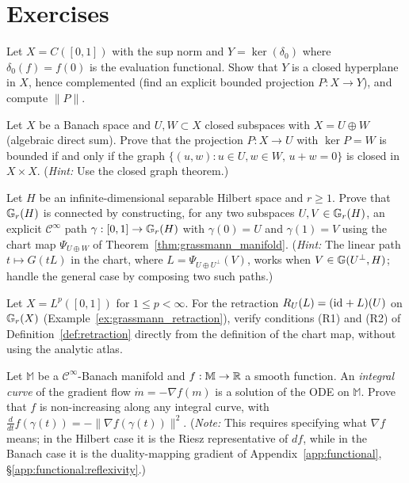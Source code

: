 \section{Exercises}
\label{sec:banach:exercises}

\begin{exercise}
Let $X = C([0,1])$ with the sup norm and $Y = \ker(\delta_0)$ where
$\delta_0(f) = f(0)$ is the evaluation functional. Show that $Y$ is
a closed hyperplane in $X$, hence complemented (find an explicit
bounded projection $P: X \to Y$), and compute $\|P\|$.
\end{exercise}

\begin{exercise}
Let $X$ be a Banach space and $U, W \subset X$ closed subspaces with
$X = U \oplus W$ (algebraic direct sum). Prove that the projection
$P: X \to U$ with $\ker P = W$ is bounded if and only if the graph
$\{(u, w) : u \in U, w \in W,\, u + w = 0\}$ is closed in $X \times X$.
(\emph{Hint:} Use the closed graph theorem.)
\end{exercise}

\begin{exercise}
Let $H$ be an infinite-dimensional separable Hilbert space and $r \geq 1$.
Prove that $\mathbb{G}_{r}(H)$ is connected by constructing, for any two
subspaces $U, V \in \mathbb{G}_{r}(H)$, an explicit $\mathcal{C}^\infty$
path $\gamma: [0,1] \to \mathbb{G}_{r}(H)$ with $\gamma(0) = U$ and
$\gamma(1) = V$ using the chart map $\Psi_{U \oplus W}$ of
Theorem~\ref{thm:grassmann_manifold}.
(\emph{Hint:} The linear path $t \mapsto G(tL)$ in the chart, where
$L = \Psi_{U \oplus U^\perp}(V)$, works when $V \in \mathbb{G}(U^\perp, H)$;
handle the general case by composing two such paths.)
\end{exercise}

\begin{exercise}
Let $X = L^p([0,1])$ for $1 \leq p < \infty$. For the retraction
$R_U(L) = (\mathrm{id}_{} + L)(U)$ on $\mathbb{G}_{r}(X)$
(Example~\ref{ex:grassmann_retraction}), verify conditions (R1) and
(R2) of Definition~\ref{def:retraction} directly from the definition
of the chart map, without using the analytic atlas.
\end{exercise}

\begin{exercise}
Let $\mathbb{M}$ be a $\mathcal{C}^\infty$-Banach manifold and
$f: \mathbb{M} \to \mathbb{R}$ a smooth function. An \emph{integral curve}
of the gradient flow $\dot m = -\nabla f(m)$ is a solution of the ODE
on $\mathbb{M}$. Prove that $f$ is non-increasing along any integral
curve, with $\frac{d}{dt}f(\gamma(t)) = -\|\nabla f(\gamma(t))\|^2$.
(\emph{Note:} This requires specifying what $\nabla f$ means; in the
Hilbert case it is the Riesz representative of $df$, while in the Banach
case it is the duality-mapping gradient of
Appendix~\ref{app:functional}, \S\ref{app:functional:reflexivity}.)
\end{exercise}

